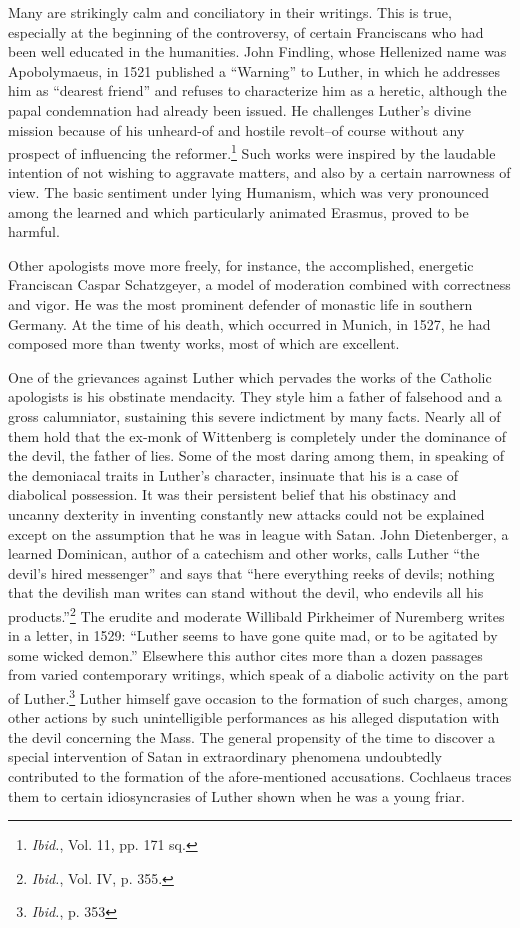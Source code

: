 Many are strikingly calm and conciliatory in their writings. This is
true, especially at the beginning of the controversy, of certain Franciscans
who had been well educated in the humanities. John Findling,
whose Hellenized name was Apobolymaeus, in 1521 published a
“Warning” to Luther, in which he addresses him as “dearest friend”
and refuses to characterize him as a heretic, although the papal condemnation
had already been issued. He challenges Luther’s divine
mission because of his unheard-of and hostile revolt--of course without
any prospect of influencing the reformer.\footnote{\textit{Ibid.}, Vol. 11, pp. 171 sq.}
Such works were inspired
by the laudable intention of not wishing to aggravate matters,
and also by a certain narrowness of view. The basic sentiment under
lying Humanism, which was very pronounced among the learned and
which particularly animated Erasmus, proved to be harmful.

Other apologists move more freely, for instance, the accomplished,
energetic Franciscan Caspar Schatzgeyer, a model of moderation combined
with correctness and vigor. He was the most prominent defender
of monastic life in southern Germany. At the time of his death,
which occurred in Munich, in 1527, he had composed more than
twenty works, most of which are excellent.

One of the grievances against Luther which pervades the works of
the Catholic apologists is his obstinate mendacity. They style him a
father of falsehood and a gross calumniator, sustaining this severe
indictment by many facts. Nearly all of them hold that the ex-monk
of Wittenberg is completely under the dominance of the devil, the
father of lies. Some of the most daring among them, in speaking of
the demoniacal traits in Luther’s character, insinuate that his is a
case of diabolical possession. It was their persistent belief that his
obstinacy and uncanny dexterity in inventing constantly new attacks
could not be explained except on the assumption that he was in league
with Satan. John Dietenberger, a learned Dominican, author of a
catechism and other works, calls Luther “the devil’s hired messenger”
and says that “here everything reeks of devils; nothing that the
devilish man writes can stand without the devil, who endevils all his
products.”\footnote{\textit{Ibid.}, Vol. IV, p. 355.}
The erudite and moderate Willibald Pirkheimer of
Nuremberg writes in a letter, in 1529: “Luther seems to have gone
quite mad, or to be agitated by some wicked demon.” Elsewhere this
author cites more than a dozen passages from varied contemporary
writings, which speak of a diabolic activity on the part of Luther.\footnote{\textit{Ibid.}, p. 353}
Luther himself gave occasion to the formation of such charges, among
other actions by such unintelligible performances as his alleged disputation
with the devil concerning the Mass. The general propensity
of the time to discover a special intervention of Satan in extraordinary
phenomena undoubtedly contributed to the formation of the
afore-mentioned accusations. Cochlaeus traces them to certain idiosyncrasies
of Luther shown when he was a young friar.

